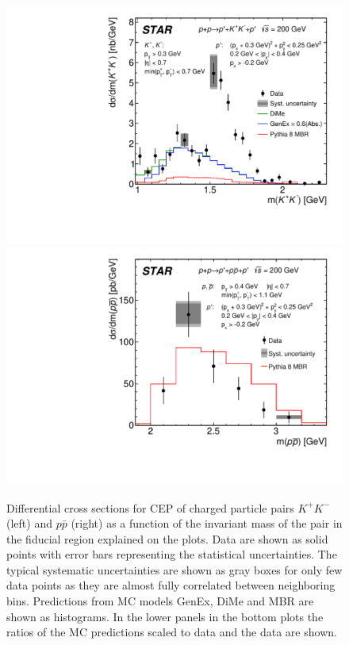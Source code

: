 \begin{figure}[t]
\centering
\includegraphics[width=.48\textwidth,page=1]{graphics/physicsResults/FinalResult_InvMass_kaon.pdf}
\includegraphics[width=.48\textwidth,page=1]{graphics/physicsResults/FinalResult_InvMass_proton.pdf}
%
\caption{Differential cross sections for CEP of charged particle pairs $K^+K^-$ (left) and $p\bar{p}$ (right) as a function of the invariant mass of the pair in the fiducial region explained on the plots. Data are shown as solid points with error bars representing the statistical uncertainties. The typical systematic uncertainties are shown as gray boxes for only few data points as they are almost fully correlated between neighboring bins. Predictions from MC models GenEx, DiMe and MBR are shown as histograms. In the lower panels in the bottom plots the ratios of the MC predictions scaled to data and the data are shown.}
\label{results_02}
\end{figure}
% 
